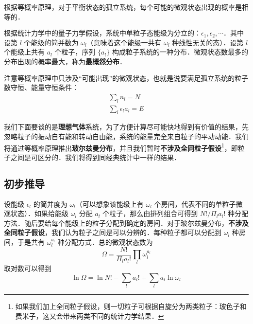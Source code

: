 

根据等概率原理，对于平衡状态的孤立系统，每个可能的微观状态出现的概率是相等的．

根据统计力学中的量子力学假设，系统中单粒子态能级为分立的：$\epsilon_1,\epsilon_2,\cdots$．其中设第 $l$ 个能级的简并数为 $\omega_l$（意味着这个能级一共有 $\omega_l$ 种线性无关的态）．设第 $l$ 个能级上共有 $a_l$ 个粒子，序列 $\{a_l\}$ 构成粒子系统的一种分布．微观状态数最多的分布出现的概率最大，称为\textbf{最概然分布}．

注意等概率原理中只涉及“可能出现”的微观状态，也就是说要满足孤立系统的粒子数守恒、能量守恒条件：
\begin{equation}\label{MBsta_eq1}
\begin{aligned}
\sum_l n_l=N\\
\sum_l \epsilon_l a_l=E
\end{aligned}
\end{equation}

我们下面要谈的是\textbf{理想气体}系统，为了方便计算尽可能快地得到有价值的结果，先忽略粒子的振动自有能和转动自由能，系统的能量完全来自粒子的平动动能．我们将通过等概率原理推出\textbf{玻尔兹曼分布}，并且我们暂时\textbf{不涉及全同粒子假设}\footnote{如果我们加上全同粒子假设，则一切粒子可根据自旋分为两类粒子：玻色子和费米子，这又会带来两类不同的统计力学结果．}，即粒子之间是可区分的．我们将得到同经典统计中一样的结果．

\subsection{初步推导}
设能级 $\epsilon_l$ 的简并度为 $\omega_l$（可以想象该能级上有 $\omega_l$ 个房间，代表不同的单粒子微观状态）．如果给能级 $\omega_l$ 分配 $a_l$ 个粒子，那么由排列组合可得到 $N!/\Pi_l a_l!$ 种分配方法．随后要给每个能级上的粒子分配到确定的房间．对于玻尔兹曼分布，\textbf{不涉及全同粒子假设}，我们认为粒子之间是可以分辨的．每种粒子都可以分配到 $\omega_l$ 种房间，于是共有 $\omega_l^{a_l}$ 种分配方式．总的微观状态数为
\begin{equation}
\Omega=\frac{N!}{\Pi_l a_l!}\prod_l\omega_l^{a_l}
\end{equation}
取对数可以得到
\begin{equation}
\ln \Omega=\ln N!-\sum_{l}a_l!+\sum_l a_l\ln \omega_l
\end{equation}

